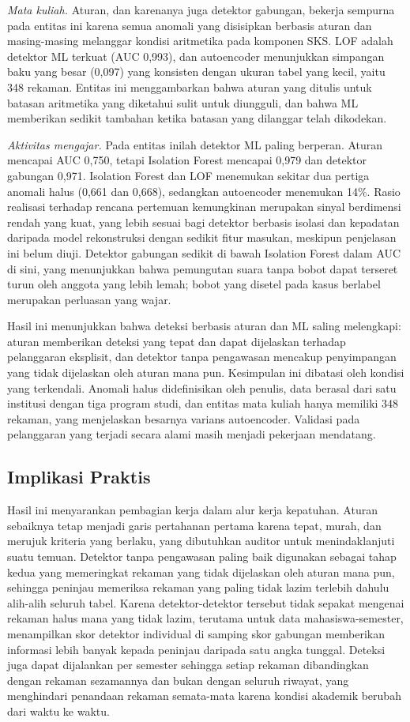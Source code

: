 \documentclass[conference]{IEEEtran}
\begin{document}
\textit{Mata kuliah.} Aturan, dan karenanya juga detektor gabungan, bekerja sempurna pada entitas ini karena semua anomali yang disisipkan berbasis aturan dan masing-masing melanggar kondisi aritmetika pada komponen SKS. LOF adalah detektor ML terkuat (AUC 0,993), dan autoencoder menunjukkan simpangan baku yang besar (0,097) yang konsisten dengan ukuran tabel yang kecil, yaitu 348 rekaman. Entitas ini menggambarkan bahwa aturan yang ditulis untuk batasan aritmetika yang diketahui sulit untuk diungguli, dan bahwa ML memberikan sedikit tambahan ketika batasan yang dilanggar telah dikodekan.

\textit{Aktivitas mengajar.} Pada entitas inilah detektor ML paling berperan. Aturan mencapai AUC 0,750, tetapi Isolation Forest mencapai 0,979 dan detektor gabungan 0,971. Isolation Forest dan LOF menemukan sekitar dua pertiga anomali halus (0,661 dan 0,668), sedangkan autoencoder menemukan 14\%. Rasio realisasi terhadap rencana pertemuan kemungkinan merupakan sinyal berdimensi rendah yang kuat, yang lebih sesuai bagi detektor berbasis isolasi dan kepadatan daripada model rekonstruksi dengan sedikit fitur masukan, meskipun penjelasan ini belum diuji. Detektor gabungan sedikit di bawah Isolation Forest dalam AUC di sini, yang menunjukkan bahwa pemungutan suara tanpa bobot dapat terseret turun oleh anggota yang lebih lemah; bobot yang disetel pada kasus berlabel merupakan perluasan yang wajar.

Hasil ini menunjukkan bahwa deteksi berbasis aturan dan ML saling melengkapi: aturan memberikan deteksi yang tepat dan dapat dijelaskan terhadap pelanggaran eksplisit, dan detektor tanpa pengawasan mencakup penyimpangan yang tidak dijelaskan oleh aturan mana pun. Kesimpulan ini dibatasi oleh kondisi yang terkendali. Anomali halus didefinisikan oleh penulis, data berasal dari satu institusi dengan tiga program studi, dan entitas mata kuliah hanya memiliki 348 rekaman, yang menjelaskan besarnya varians autoencoder. Validasi pada pelanggaran yang terjadi secara alami masih menjadi pekerjaan mendatang.

\subsection{Implikasi Praktis}
Hasil ini menyarankan pembagian kerja dalam alur kerja kepatuhan. Aturan sebaiknya tetap menjadi garis pertahanan pertama karena tepat, murah, dan merujuk kriteria yang berlaku, yang dibutuhkan auditor untuk menindaklanjuti suatu temuan. Detektor tanpa pengawasan paling baik digunakan sebagai tahap kedua yang memeringkat rekaman yang tidak dijelaskan oleh aturan mana pun, sehingga peninjau memeriksa rekaman yang paling tidak lazim terlebih dahulu alih-alih seluruh tabel. Karena detektor-detektor tersebut tidak sepakat mengenai rekaman halus mana yang tidak lazim, terutama untuk data mahasiswa-semester, menampilkan skor detektor individual di samping skor gabungan memberikan informasi lebih banyak kepada peninjau daripada satu angka tunggal. Deteksi juga dapat dijalankan per semester sehingga setiap rekaman dibandingkan dengan rekaman sezamannya dan bukan dengan seluruh riwayat, yang menghindari penandaan rekaman semata-mata karena kondisi akademik berubah dari waktu ke waktu.
\end{document}
